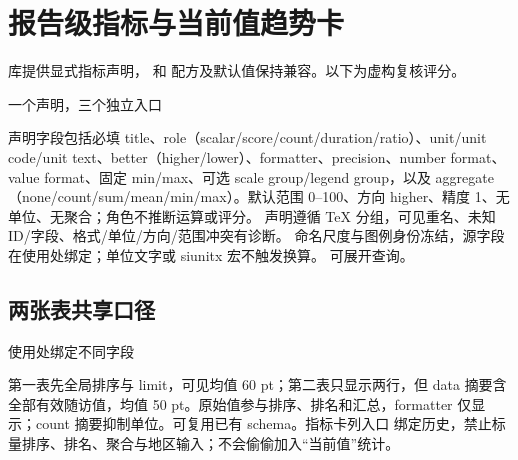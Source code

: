 \section{报告级指标与当前值趋势卡}
 库提供显式指标声明，\key{\gradmetric} 和 \key{\gradmetriccolumn} 配方及默认值保持兼容。以下为虚构复核评分。
\begin{example}[text and listing,sidebyside=false]{一个声明，三个独立入口}
\begingroup
{}
\quad
{}\par\medskip
{}\par\medskip
{}
\endgroup
\end{example}
声明字段包括必填 title、role（scalar/score/count/duration/ratio）、unit/unit code/unit text、better（higher/lower）、formatter、precision、number format、value format、固定 min/max、可选 scale group/legend group，以及 aggregate（none/count/sum/mean/min/max）。默认范围 0--100、方向 higher、精度 1、无单位、无聚合；角色不推断运算或评分。
声明遵循 TeX 分组，可见重名、未知 ID/字段、格式/单位/方向/范围冲突有诊断。
命名尺度与图例身份冻结，源字段在使用处绑定；单位文字或 siunitx 宏不触发换算。
 可展开查询。
\clearpage
\subsection{两张表共享口径}
\begin{example}[text and listing,sidebyside=false]{使用处绑定不同字段}
\begingroup
{}
\begin{gradtable}[data=reviews,style=metric-report,
 width=\linewidth,sort=score,order=descending,limit=2]
\end{gradtable}\par\medskip
\begin{gradtable}[data=reviews,style=metric-report,
 width=\linewidth,limit=2]
\end{gradtable}
\endgroup
\end{example}
第一表先全局排序与 limit，可见均值 60 pt；第二表只显示两行，但 data 摘要含全部有效随访值，均值 50 pt。原始值参与排序、排名和汇总，formatter 仅显示；count 摘要抑制单位。可复用已有 schema。指标卡列入口  绑定历史，禁止标量排序、排名、聚合与地区输入；不会偷偷加入“当前值”统计。
\clearpage

